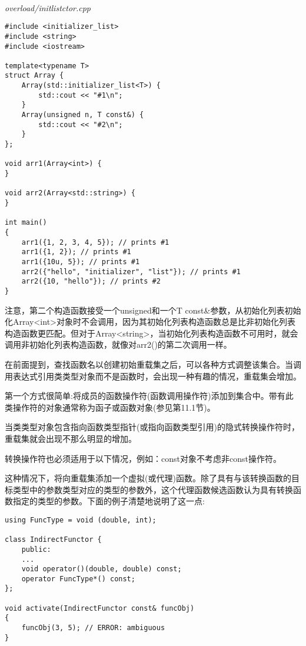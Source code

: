 \hspace*{\fill} \\ %
\noindent
\textit{overload/initlistctor.cpp}
\begin{lstlisting}[style=styleCXX]
#include <initializer_list>
#include <string>
#include <iostream>

template<typename T>
struct Array {
	Array(std::initializer_list<T>) {
		std::cout << "#1\n";
	}
	Array(unsigned n, T const&) {
		std::cout << "#2\n";
	}
};

void arr1(Array<int>) {
}

void arr2(Array<std::string>) {
}

int main()
{
	arr1({1, 2, 3, 4, 5}); // prints #1
	arr1({1, 2}); // prints #1
	arr1({10u, 5}); // prints #1
	arr2({"hello", "initializer", "list"}); // prints #1
	arr2({10, "hello"}); // prints #2
}
\end{lstlisting}

注意，第二个构造函数接受一个unsigned和一个T const\&参数，从初始化列表初始化Array<int>对象时不会调用，因为其初始化列表构造函数总是比非初始化列表构造函数更匹配。但对于Array<string>，当初始化列表构造函数不可用时，就会调用非初始化列表构造函数，就像对arr2()的第二次调用一样。


在前面提到，查找函数名以创建初始重载集之后，可以各种方式调整该集合。当调用表达式引用类类型对象而不是函数时，会出现一种有趣的情况，重载集会增加。

第一个方式很简单:将成员的函数操作符(函数调用操作符)添加到集合中。带有此类操作符的对象通常称为函子或函数对象(参见第11.1节)。

当类类型对象包含指向函数类型指针(或指向函数类型引用)的隐式转换操作符时，重载集就会出现不那么明显的增加。

\begin{tcolorbox}[colback=webgreen!5!white,colframe=webgreen!75!black]
\hspace*{0.75cm}转换操作符也必须适用于以下情况，例如：const对象不考虑非const操作符。
\end{tcolorbox}

这种情况下，将向重载集添加一个虚拟(或代理)函数。除了具有与该转换函数的目标类型中的参数类型对应的类型的参数外，这个代理函数候选函数认为具有转换函数指定的类型的参数。下面的例子清楚地说明了这一点:

\begin{lstlisting}[style=styleCXX]
using FuncType = void (double, int);

class IndirectFunctor {
	public:
	...
	void operator()(double, double) const;
	operator FuncType*() const;
};

void activate(IndirectFunctor const& funcObj)
{
	funcObj(3, 5); // ERROR: ambiguous
}
\end{lstlisting}

